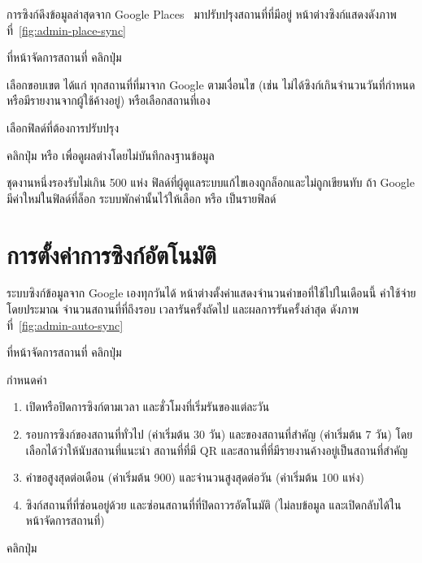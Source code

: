 การซิงก์ดึงข้อมูลล่าสุดจาก Google Places~\cite{googleplaces2026} มาปรับปรุงสถานที่ที่มีอยู่ หน้าต่างซิงก์แสดงดังภาพที่~\ref{fig:admin-place-sync}


\begin{steps}
  \item ที่หน้าจัดการสถานที่ คลิกปุ่ม 
  \item เลือกขอบเขต ได้แก่ ทุกสถานที่ที่มาจาก Google ตามเงื่อนไข (เช่น ไม่ได้ซิงก์เกินจำนวนวันที่กำหนด หรือมีรายงานจากผู้ใช้ค้างอยู่) หรือเลือกสถานที่เอง
  \item เลือกฟิลด์ที่ต้องการปรับปรุง
  \item คลิกปุ่ม  หรือ  เพื่อดูผลต่างโดยไม่บันทึกลงฐานข้อมูล
\end{steps}

\begin{note}
ชุดงานหนึ่งรองรับไม่เกิน 500 แห่ง ฟิลด์ที่ผู้ดูแลระบบแก้ไขเองถูกล็อกและไม่ถูกเขียนทับ ถ้า Google มีค่าใหม่ในฟิลด์ที่ล็อก ระบบพักค่านั้นไว้ให้เลือก  หรือ  เป็นรายฟิลด์
\end{note}

\section{การตั้งค่าการซิงก์อัตโนมัติ}
\label{sec:auto-sync}

ระบบซิงก์ข้อมูลจาก Google เองทุกวันได้ หน้าต่างตั้งค่าแสดงจำนวนคำขอที่ใช้ไปในเดือนนี้ ค่าใช้จ่ายโดยประมาณ จำนวนสถานที่ที่ถึงรอบ เวลารันครั้งถัดไป และผลการรันครั้งล่าสุด ดังภาพที่~\ref{fig:admin-auto-sync}


\begin{steps}
  \item ที่หน้าจัดการสถานที่ คลิกปุ่ม 
  \item กำหนดค่า
        \begin{enumerate}
          \item เปิดหรือปิดการซิงก์ตามเวลา และชั่วโมงที่เริ่มรันของแต่ละวัน
          \item รอบการซิงก์ของสถานที่ทั่วไป (ค่าเริ่มต้น 30 วัน) และของสถานที่สำคัญ (ค่าเริ่มต้น 7 วัน) โดยเลือกได้ว่าให้นับสถานที่แนะนำ สถานที่ที่มี QR และสถานที่ที่มีรายงานค้างอยู่เป็นสถานที่สำคัญ
          \item คำขอสูงสุดต่อเดือน (ค่าเริ่มต้น 900) และจำนวนสูงสุดต่อวัน (ค่าเริ่มต้น 100 แห่ง)
          \item ซิงก์สถานที่ที่ซ่อนอยู่ด้วย และซ่อนสถานที่ที่ปิดถาวรอัตโนมัติ (ไม่ลบข้อมูล และเปิดกลับได้ในหน้าจัดการสถานที่)
        \end{enumerate}
  \item คลิกปุ่ม 
\end{steps}

